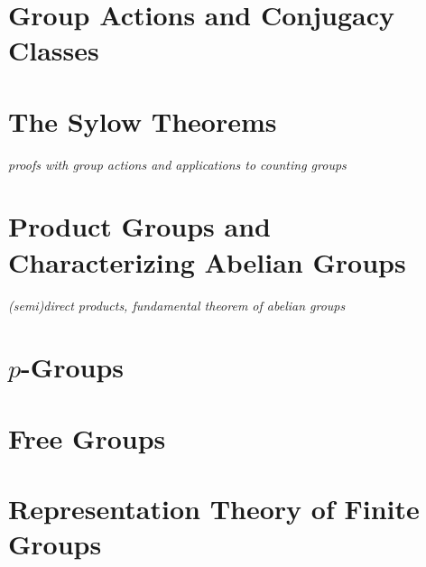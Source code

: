 \documentclass[../../../main.tex]{subfiles}
\begin{document}

\section{Group Actions and Conjugacy Classes}
\section{The Sylow Theorems}
\textit{proofs with group actions and applications to counting groups}
\section{Product Groups and Characterizing Abelian Groups}
\textit{(semi)direct products, fundamental theorem of abelian groups}
\section{$p$-Groups}
\section{Free Groups}
\section{Representation Theory of Finite Groups}

\printbibliography[
    heading=subbibintoc,
    title={References}
]
\end{document}
